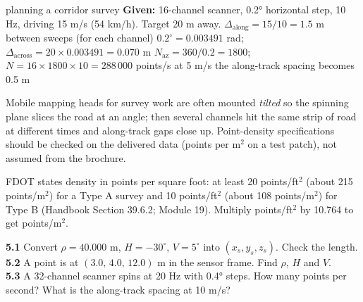 \begin{worked}{planning a corridor survey}
\textbf{Given:} 16-channel scanner, 0.2° horizontal step, 10 Hz, driving 15 m/s (54 km/h). Target 20 m away.
 $\Delta_{\text{along}}=15/10=1.5$ m between sweeps (for each channel)
 $0.2^\circ=0.003491$ rad; $\Delta_{\text{across}}=20\times0.003491=0.070$ m
 $N_{\text{az}}=360/0.2=1800$; $N=16\times1800\times10=288\,000$ points/s
 at 5 m/s the along-track spacing becomes 0.5 m
\end{worked}

\begin{tip}
Mobile mapping heads for survey work are often mounted \emph{tilted} so the spinning plane slices the road at an angle; then several channels hit the same strip of road at different times and along-track gaps close up. Point-density specifications should be checked on the delivered data (points per m$^2$ on a test patch), not assumed from the brochure.
\end{tip}

FDOT states density in points per square foot: at least 20 points/ft$^2$ (about 215 points/m$^2$) for a Type A survey and 10 points/ft$^2$ (about 108 points/m$^2$) for Type B (Handbook Section 39.6.2; Module 19). Multiply points/ft$^2$ by 10.764 to get points/m$^2$.

\begin{tryit}
\textbf{5.1} Convert $\rho=40.000$ m, $H=-30^\circ$, $V=5^\circ$ into $(x_s,y_s,z_s)$. Check the length.\\
\textbf{5.2} A point is at $(3.0,\,4.0,\,12.0)$ m in the sensor frame. Find $\rho$, $H$ and $V$.\\
\textbf{5.3} A 32-channel scanner spins at 20 Hz with 0.4° steps. How many points per second? What is the along-track spacing at 10 m/s?
\end{tryit}

